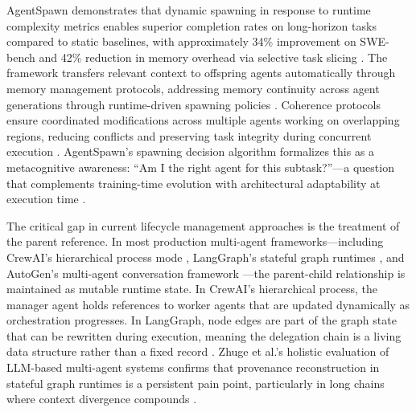 \documentclass[11pt,oneside]{article}
\begin{document}
AgentSpawn demonstrates that dynamic spawning in response to runtime complexity metrics enables superior completion rates on long-horizon tasks compared to static baselines, with approximately 34\% improvement on SWE-bench and 42\% reduction in memory overhead via selective task slicing \cite{agentspawn2026}. The framework transfers relevant context to offspring agents automatically through memory management protocols, addressing memory continuity across agent generations through runtime-driven spawning policies \cite{agentspawn2026}. Coherence protocols ensure coordinated modifications across multiple agents working on overlapping regions, reducing conflicts and preserving task integrity during concurrent execution \cite{agentspawn2026}. AgentSpawn's spawning decision algorithm formalizes this as a metacognitive awareness: ``Am I the right agent for this subtask?''---a question that complements training-time evolution with architectural adaptability at execution time \cite{agentspawn2026}.

The critical gap in current lifecycle management approaches is the treatment of the parent reference. In most production multi-agent frameworks---including CrewAI's hierarchical process mode \cite{crewai2024}, LangGraph's stateful graph runtimes \cite{langchain2023}, and AutoGen's multi-agent conversation framework \cite{autogen2023}---the parent-child relationship is maintained as mutable runtime state. In CrewAI's hierarchical process, the manager agent holds references to worker agents that are updated dynamically as orchestration progresses. In LangGraph, node edges are part of the graph state that can be rewritten during execution, meaning the delegation chain is a living data structure rather than a fixed record \cite{zhuge2024}. Zhuge et al.'s holistic evaluation of LLM-based multi-agent systems confirms that provenance reconstruction in stateful graph runtimes is a persistent pain point, particularly in long chains where context divergence compounds \cite{zhuge2024}.
\end{document}
